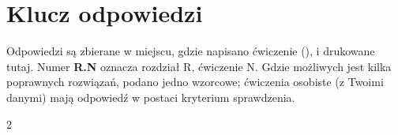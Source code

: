 \chapter{Klucz odpowiedzi}
Odpowiedzi są zbierane w miejscu, gdzie napisano ćwiczenie (), i drukowane tutaj.
Numer \textbf{R.N} oznacza rozdział R, ćwiczenie N. Gdzie możliwych jest kilka poprawnych rozwiązań,
podano jedno wzorcowe; ćwiczenia osobiste (z Twoimi danymi) mają odpowiedź w postaci kryterium sprawdzenia.
\begin{multicols}{2}\small\raggedright
\answerstore
\end{multicols}
